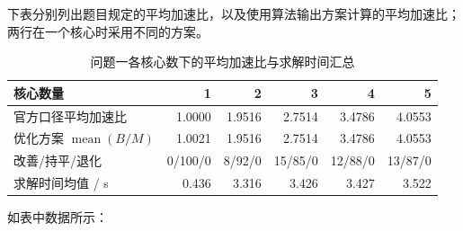 \documentclass[anonymous,withtoc]{gmcm2026}
\begin{document}
下表分别列出题目规定的平均加速比，以及使用算法输出方案计算的平均加速比；两行在一个核心时采用不同的方案。



\begin{table}[!htbp]\centering
\caption{问题一各核心数下的平均加速比与求解时间汇总}\label{tab:p1-results}\normalsize

\begin{tabularx}{\linewidth}{@{}Xrrrrr@{}}\toprule
核心数量 & 1 & 2 & 3 & 4 & 5 \\
\midrule
官方口径平均加速比 & 1.0000 & 1.9516 & 2.7514 & 3.4786 & 4.0553 \\
优化方案 $\operatorname{mean}(B/M)$ & 1.0021 & 1.9516 & 2.7514 & 3.4786 & 4.0553 \\
改善/持平/退化 & 0/100/0 & 8/92/0 & 15/85/0 & 12/88/0 & 13/87/0 \\
求解时间均值 / s & 0.436 & 3.316 & 3.426 & 3.427 & 3.522 \\
\bottomrule\end{tabularx}\end{table}

如表中数据所示：
\end{document}
